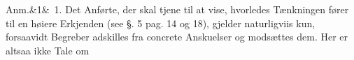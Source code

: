 \documentclass[12pt]{book}
\def\sperr#1{#1}%
\def\textit#1{#1}%
\def\emph#1{#1}%
\newcommand{\sperr}[1]{\textls[180]{#1}}
\newcommand{\anm}[1]{%
  \par\vspace{0.5\baselineskip}%
  \noindent\hspace{\parindent}\sperr{Anm.}\ifx&#1&\else~\textit{#1}.\fi
  \enspace\ignorespaces
}
\newcommand{\opage}[1]{\marginnote{\footnotesize\textit{[#1]}}}
\begin{document}
\opage{149} %
\anm{1} Det Anførte, der skal tjene til at vise, hvorledes Tænkningen fører til en
høiere Erkjenden (see §. 5 pag. 14 og 18), gjelder naturligviis kun, forsaavidt
Begreber adskilles fra concrete Anskuelser og modsættes dem. Her er altsaa ikke Tale om
\end{document}
